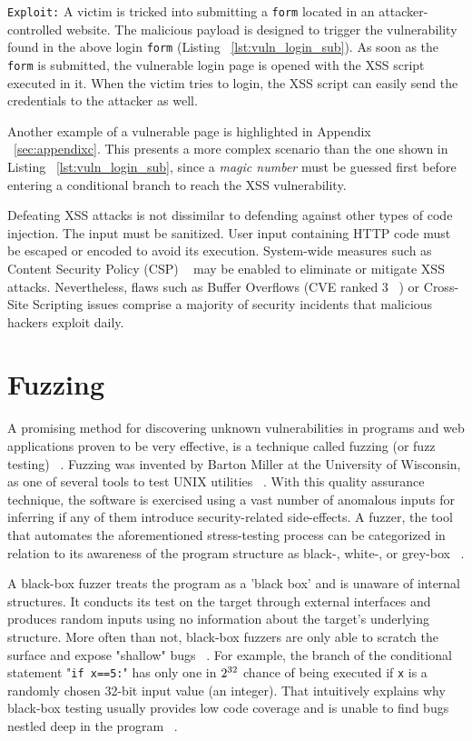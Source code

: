 {\tt Exploit:} A victim is tricked into submitting a {\tt form} located in an attacker-controlled website. The malicious payload is designed to trigger the vulnerability found in the above login {\tt form} (Listing ~\ref{lst:vuln_login_sub}). As soon as the {\tt form} is submitted, the vulnerable login page is opened with the XSS script executed in it. When the victim tries to login, the XSS script can easily send the credentials to the attacker as well. 

Another example of a vulnerable page is highlighted in Appendix ~\ref{sec:appendixc}. This presents a more complex scenario than the one shown in Listing ~\ref{lst:vuln_login_sub}, since a \emph{magic number} must be guessed first before entering a conditional branch to reach the XSS vulnerability.

Defeating XSS attacks is not dissimilar to defending against other types of code injection.
The input must be sanitized. User input containing HTTP code must be escaped or encoded to avoid its execution. System-wide measures such as Content Security Policy (CSP) ~\cite{csp_def} may be enabled to eliminate or mitigate XSS attacks. Nevertheless, flaws such as Buffer Overflows (CVE ranked 3 ~\cite{cve}) or Cross-Site Scripting issues comprise a majority of security incidents that malicious hackers exploit daily. 

\section{Fuzzing}
A promising method for discovering unknown vulnerabilities in programs and web applications proven to be very effective, is a technique called fuzzing (or fuzz testing) ~\cite{fuzzing_def}. Fuzzing was invented by Barton Miller at the University of Wisconsin, as one of several tools to test UNIX utilities ~\cite{mller1990fuzz}. With this quality assurance technique, the software is exercised using a vast number of anomalous inputs for inferring if any of them introduce security-related side-effects. A fuzzer, the tool that automates the aforementioned stress-testing process can be categorized in relation to its awareness of the program structure as black-, white-, or grey-box ~\cite{fuzzing_book}. 

A black-box fuzzer treats the program as a 'black box' and is unaware of internal structures. It conducts its test on the target through external interfaces and produces random inputs using no information about the target's underlying structure. More often than not, black-box fuzzers are only able to scratch the surface and expose "shallow" bugs ~\cite{fuzzing_owasp}. For example, the branch of the conditional statement "{\tt if x==5:}" has only one in $2\textsuperscript{32}$ chance of being executed if {\tt x} is a randomly chosen 32-bit input value (\ie an integer). That intuitively explains why black-box testing usually provides low code coverage and is unable to find bugs nestled deep in the program ~\cite{Godefroid2008AutomatedWF}.

